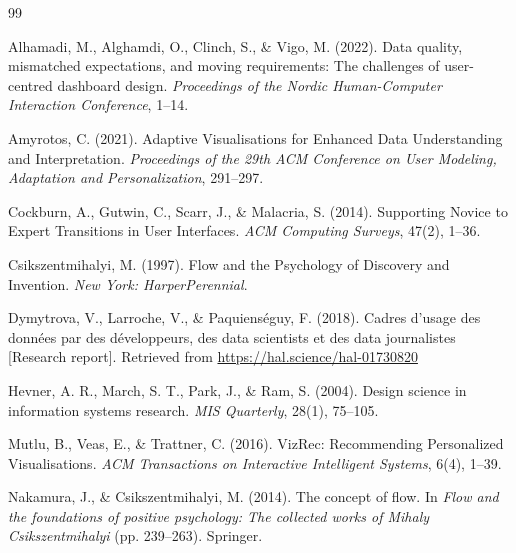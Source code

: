 \documentclass[12pt,a4paper]{article}
\begin{document}

\begin{thebibliography}{99}

Alhamadi, M., Alghamdi, O., Clinch, S., \& Vigo, M. (2022).
\newblock Data quality, mismatched expectations, and moving requirements: The challenges of user-centred dashboard design.
\newblock \textit{Proceedings of the Nordic Human-Computer Interaction Conference}, 1--14.
\newblock {}


 Amyrotos, C. (2021).
 \newblock Adaptive Visualisations for Enhanced Data Understanding and Interpretation.
 \newblock \textit{Proceedings of the 29th ACM Conference on User Modeling, Adaptation and Personalization}, 291--297.
 \newblock {}

 Cockburn, A., Gutwin, C., Scarr, J., \& Malacria, S. (2014).
 \newblock Supporting Novice to Expert Transitions in User Interfaces.
 \newblock \textit{ACM Computing Surveys}, 47(2), 1--36.
 \newblock {}

Csikszentmihalyi, M. (1997). Flow and the Psychology of Discovery and Invention. \textit{New York: HarperPerennial}.

Dymytrova, V., Larroche, V., \& Paquienséguy, F. (2018).
\newblock Cadres d'usage des données par des développeurs, des data scientists et des data journalistes [Research report].
\newblock Retrieved from \url{https://hal.science/hal-01730820}

Hevner, A. R., March, S. T., Park, J., \& Ram, S. (2004).
\newblock Design science in information systems research.
\newblock \textit{MIS Quarterly}, 28(1), 75--105.
\newblock {}

 Mutlu, B., Veas, E., \& Trattner, C. (2016).
 \newblock VizRec: Recommending Personalized Visualisations.
 \newblock \textit{ACM Transactions on Interactive Intelligent Systems}, 6(4), 1--39.
 \newblock {}

Nakamura, J., \& Csikszentmihalyi, M. (2014).
\newblock The concept of flow.
\newblock In \textit{Flow and the foundations of positive psychology: The collected works of Mihaly Csikszentmihalyi} (pp. 239--263).
\newblock Springer.


\end{thebibliography}
\end{document}
